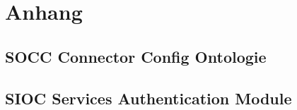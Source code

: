 
\chapter{Anhang} %
\label{cha:anhang}

\section{SOCC Connector Config Ontologie} %
\label{sec:anhang_socc_connector_config_ontologie}




\section{SIOC Services Authentication Module} %
\label{sec:anhang_sioc_services_authentication_module}





